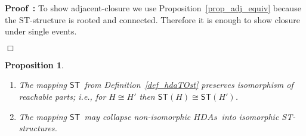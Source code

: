 \documentclass[submission,copyright,creativecommons]{eptcs}
\newtheorem{proposition}[theorem]{Proposition}
\newenvironment{proof}[1][\!\!\,]{\vspace{1ex}\noindent\textbf{Proof #1: }}{\hfill$\Box$\vspace{2ex}}
\newcommand{\cp}[1]{}
\newcommand\HDAs{\ensuremath{\mathit{HDAs}}}
\newcommand\modelH{\ensuremath{\mathcal{H}}}
\newcommand\isomorphic{\ensuremath{\cong}}
\newcommand\hintost{\ensuremath{\mathsf{ST}}}
\newcommand\finishPath[1]{\ensuremath{\mathit{en}(#1)}}
\begin{document}
\begin{proof}
To show adjacent-closure we use Proposition~\ref{prop_adj_equiv} because the ST-structure is rooted and connected. Therefore it is enough to show closure under single events. 
\cp{
We base the rest of the proof on the following.

\vspace{1ex}
\noindent\textit{Claim:}\hspace{1ex} $\forall\pi: \finishPath{\pi}\in Q_{n} \Rightarrow \hintost(\pi) \mbox{ has concurrency degree }n$.
\vspace{0.5ex}

The second property of Definition~\ref{def_closeSingleEv} is obtained from the above fact that in the extension step the ST-configuration that we introduce differs in exactly one event; and since we have chosen two arbitrary s-maps, we obtain the result for all the concurrent events. Showing the first constraint of Definition~\ref{def_closeSingleEv} is simple from the completion step and the above, since this step considers each and all the s-maps, where each such map corresponds to one of the concurrent events.
\cp{Redo this last paragraph!!!}
}
\end{proof}

\cp{
\begin{proposition}\label{prop_Hpreserveshh}
For two acyclic and non-degenerate \HDAs, $\modelH$ and $\modelH'$, their corresponding rooted, connected and adjacent-closed ST-structures $\mathsf{ST}(\modelH)$ and $\mathsf{ST}(\modelH')$ are hh-bisimilar (cf.~Def.~\ref{def_hh_ST}) iff the original higher dimensional automata are hh-bisimilar.
\end{proposition}


\begin{proof}[sketch]
Intuitively, the $l$-adjacency steps for HDA correspond to the restriction 1 in Def.~\ref{def_hh_ST} of $f$-isomorphism together with the adjacent-closure properties for ST-structures.
\end{proof}
}


\begin{proposition}\label{prop_hintost_iso}
\ 

\begin{enumerate}
\item\label{prop_hintost_iso_1} The mapping \hintost\ from Definition~\ref{def_hdaTOst} preserves isomorphism of reachable parts; i.e., for $H\isomorphic H'$ then $\hintost(H)\isomorphic\hintost(H')$.

\item\label{prop_hintost_collapse} The mapping \hintost\ may collapse non-isomorphic \HDAs\ into isomorphic ST-structures.
\end{enumerate}
\end{proposition}
\end{document}
